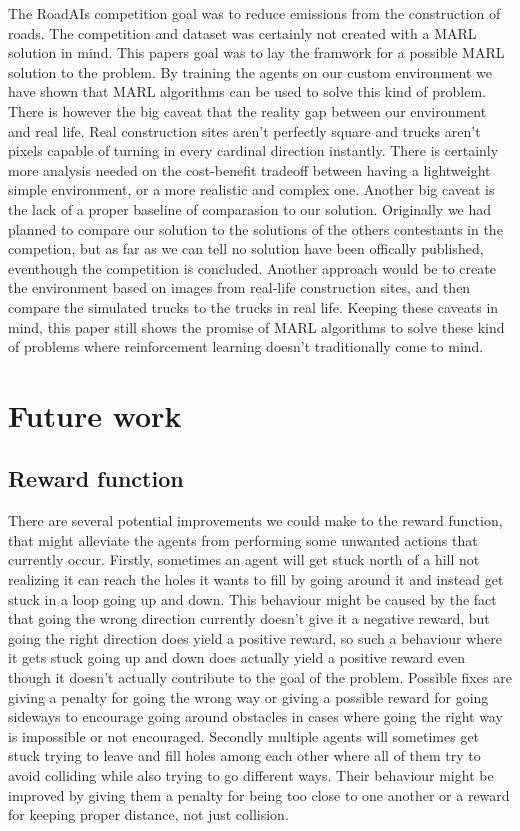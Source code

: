 \documentclass[conference]{IEEEtran}
\begin{document}
The RoadAIs competition goal was to reduce \coo{} emissions from the construction of roads.
The competition and dataset was certainly not created with a MARL solution in mind.
This papers goal was to lay the framwork for a possible MARL solution to the problem.
By training the agents on our custom environment we have shown that MARL algorithms can be used to solve this  kind of problem.
There is however the big caveat that the reality gap between our environment and real life.
Real construction sites aren't perfectly square and trucks aren't pixels capable of turning in every cardinal direction instantly. There is certainly more analysis needed on the cost-benefit tradeoff between having a lightweight simple environment, or a more realistic and complex one.
Another big caveat is the lack of a proper baseline of comparasion to our solution.
Originally we had planned to compare our solution to the solutions of the others contestants in the competion, but as far as we can tell no solution have been offically published, eventhough the competition is concluded.
Another approach would be to create the environment based on images from real-life construction sites, and then
compare the simulated trucks to the trucks in real life.
Keeping these caveats in mind, this paper still shows the promise of MARL algorithms to solve these kind of
problems where reinforcement learning doesn't traditionally come to mind.



\section{Future work}
\subsection{Reward function}
There are several potential improvements we could make to the reward function, that might alleviate the agents from performing some unwanted actions that currently occur.
Firstly, sometimes an agent will get stuck north of a hill not realizing it can reach the holes it wants to fill by going around it and instead get stuck in a loop going up and down.
This behaviour might be caused by the fact that going the wrong direction currently doesn't give it a negative reward, but going the right direction does yield a positive reward, so such a behaviour where it gets stuck going up and down does actually yield a positive reward even though it doesn't actually contribute to the goal of the problem.
Possible fixes are giving a penalty for going the wrong way or giving a possible reward for going sideways to encourage going around obstacles in cases where going the right way is impossible or not encouraged.
Secondly multiple agents will sometimes get stuck trying to leave and fill holes among each other where all of them try to avoid colliding while also trying to go different ways.
Their behaviour might be improved by giving them a penalty for being too close to one another or a reward for keeping proper distance, not just collision.
\end{document}
